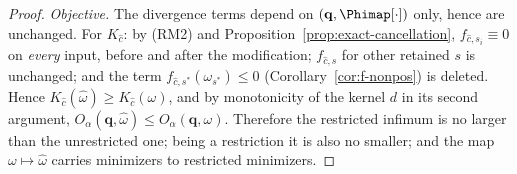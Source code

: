 \begin{proof}
\emph{Objective.} The divergence terms depend on
$(\mathbf q,\Phimap[\cdot])$ only, hence are unchanged. For
$K_{\hat c}$: by (RM2) and Proposition~\ref{prop:exact-cancellation},
$f_{\hat c,s_i}\equiv0$ on \emph{every} input, before and after the
modification; $f_{\hat c,s}$ for other retained $s$ is unchanged; and the
term $f_{\hat c,s^{*}}(\omega_{s^{*}})\le0$
(Corollary~\ref{cor:f-nonpos}) is deleted. Hence
$K_{\hat c}(\hat\omega)\ge K_{\hat c}(\omega)$, and by monotonicity of the
kernel $d$ in its second argument,
$O_{\alpha}(\mathbf q,\hat\omega)\le O_{\alpha}(\mathbf q,\omega)$.
Therefore the restricted infimum is no larger than the unrestricted one;
being a restriction it is also no smaller; and the map
$\omega\mapsto\hat\omega$ carries minimizers to restricted minimizers.
\end{proof}
